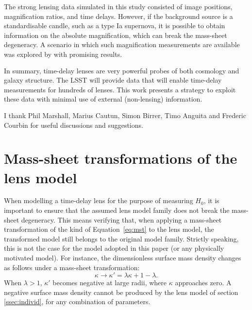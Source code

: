 \documentclass{aa}
\def\Eref#1{Equation~\ref{#1}\xspace}
\begin{document}
The strong lensing data simulated in this study consisted of image positions, magnification ratios, and time delays. 
However, if the background source is a standardisable candle, such as a type 
Ia supernova, it is possible to obtain information on the absolute magnification, which can break the mass-sheet degeneracy. A scenario in which such magnification measurements are available was explored by \citet{BDS21} with promising results.

In summary, time-delay lenses are very powerful probes of both cosmology and galaxy structure. The LSST will provide data that will enable time-delay measurements for hundreds of lenses. This work presents a strategy to exploit these data with minimal use of external (non-lensing) information.


\begin{acknowledgements}

I thank Phil Marshall, Marius Cautun, Simon Birrer, Timo Anguita and Frederic Courbin for useful discussions and suggestions.

\end{acknowledgements}





\appendix
\section{Mass-sheet transformations of the lens model}\label{sect:appendixa}

When modelling a time-delay lens for the purpose of measuring $H_0$, it is important to ensure that the assumed lens model family does not break the mass-sheet degeneracy. 
This means verifying that, when applying a mass-sheet transformation of the kind of \Eref{eq:mst} to the lens model, the transformed model still belongs to the original model family.
Strictly speaking, this is not the case for the model adopted in this paper (or any physically motivated model). 
For instance, the dimensionless surface mass density changes as follows under a mass-sheet transformation:
\begin{equation}
\kappa \rightarrow \kappa' = \lambda\kappa + 1 - \lambda.
\end{equation}
When $\lambda > 1$, $\kappa'$ becomes negative at large radii, where $\kappa$ approaches zero.
A negative surface mass density cannot be produced by the lens model of section \ref{ssec:individ}, for any combination of parameters.
\end{document}
